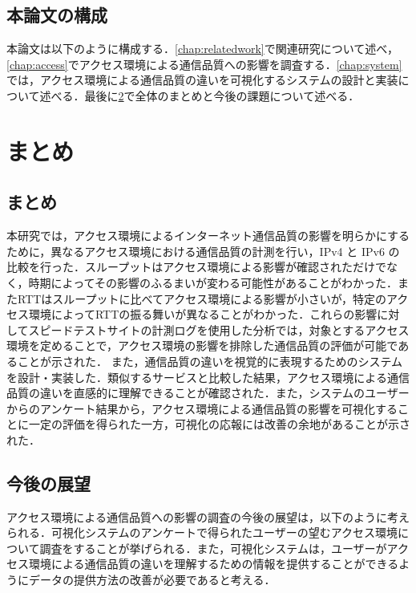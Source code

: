 \documentclass[12pt]{mthesis_utf8}
\begin{document}
\section{本論文の構成}
本論文は以下のように構成する．\cref{chap:relatedwork}で関連研究について述べ，\cref{chap:access}でアクセス環境による通信品質への影響を調査する．\cref{chap:system}では，アクセス環境による通信品質の違いを可視化するシステムの設計と実装について述べる．最後に\cref{chap:conclusion}で全体のまとめと今後の課題について述べる．







\chapter{まとめ}
\label{chap:conclusion}
\section{まとめ}
本研究では，アクセス環境によるインターネット通信品質の影響を明らかにするために，異なるアクセス環境における通信品質の計測を行い，IPv4 と IPv6 の比較を行った．スループットはアクセス環境による影響が確認されただけでなく，時期によってその影響のふるまいが変わる可能性があることがわかった．またRTTはスループットに比べてアクセス環境による影響が小さいが，特定のアクセス環境によってRTTの振る舞いが異なることがわかった．これらの影響に対してスピードテストサイトの計測ログを使用した分析では，対象とするアクセス環境を定めることで，アクセス環境の影響を排除した通信品質の評価が可能であることが示された．
また，通信品質の違いを視覚的に表現するためのシステムを設計・実装した．類似するサービスと比較した結果，アクセス環境による通信品質の違いを直感的に理解できることが確認された．また，システムのユーザーからのアンケート結果から，アクセス環境による通信品質の影響を可視化することに一定の評価を得られた一方，可視化の応報には改善の余地があることが示された．
\section{今後の展望}
アクセス環境による通信品質への影響の調査の今後の展望は，以下のように考えられる．可視化システムのアンケートで得られたユーザーの望むアクセス環境について調査をすることが挙げられる．また，可視化システムは，ユーザーがアクセス環境による通信品質の違いを理解するための情報を提供することができるようにデータの提供方法の改善が必要であると考える．
\end{document}

